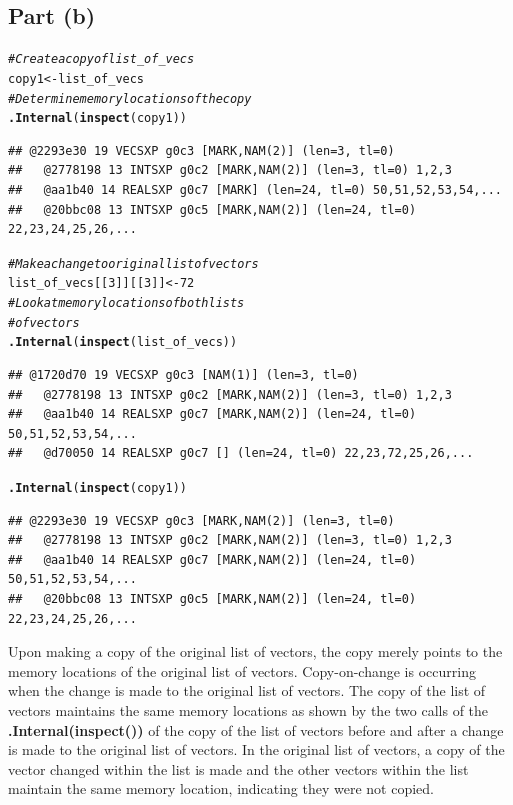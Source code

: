 \documentclass{article}\usepackage[]{graphicx}\usepackage[]{color}
\makeatletter
\newcommand{\hlnum}[1]{\textcolor[rgb]{0.686,0.059,0.569}{#1}}%
\newcommand{\hlcom}[1]{\textcolor[rgb]{0.678,0.584,0.686}{\textit{#1}}}%
\newcommand{\hlstd}[1]{\textcolor[rgb]{0.345,0.345,0.345}{#1}}%
\newcommand{\hlkwb}[1]{\textcolor[rgb]{0.69,0.353,0.396}{#1}}%
\newcommand{\hlkwd}[1]{\textcolor[rgb]{0.737,0.353,0.396}{\textbf{#1}}}%
\newenvironment{kframe}{%
 \def\at@end@of@kframe{}%
 \ifinner\ifhmode%
  \def\at@end@of@kframe{\end{minipage}}%
  \begin{minipage}{\columnwidth}%
 \fi\fi%
 \def\FrameCommand##1{\hskip\@totalleftmargin \hskip-\fboxsep
 \colorbox{shadecolor}{##1}\hskip-\fboxsep
     \hskip-\linewidth \hskip-\@totalleftmargin \hskip\columnwidth}%
 \MakeFramed {\advance\hsize-\width
   \@totalleftmargin\z@ \linewidth\hsize
   \@setminipage}}%
 {\par\unskip\endMakeFramed%
 \at@end@of@kframe}
\newenvironment{knitrout}{}{} %
\makeatother
\begin{document}
\subsection{Part (b)}
\begin{knitrout}
\color{fgcolor}\begin{kframe}
\begin{alltt}
\hlcom{#Create a copy of list_of_vecs}
\hlstd{copy1} \hlkwb{<-} \hlstd{list_of_vecs}
\hlcom{#Determine memory locations of the copy}
\hlkwd{.Internal}\hlstd{(}\hlkwd{inspect}\hlstd{(copy1))}
\end{alltt}
\begin{verbatim}
## @2293e30 19 VECSXP g0c3 [MARK,NAM(2)] (len=3, tl=0)
##   @2778198 13 INTSXP g0c2 [MARK,NAM(2)] (len=3, tl=0) 1,2,3
##   @aa1b40 14 REALSXP g0c7 [MARK] (len=24, tl=0) 50,51,52,53,54,...
##   @20bbc08 13 INTSXP g0c5 [MARK,NAM(2)] (len=24, tl=0) 22,23,24,25,26,...
\end{verbatim}
\begin{alltt}
\hlcom{#Make a change to original list of vectors}
\hlstd{list_of_vecs[[}\hlnum{3}\hlstd{]][[}\hlnum{3}\hlstd{]]} \hlkwb{<-} \hlnum{72}
\hlcom{#Look at memory locations of both lists}
\hlcom{#of vectors}
\hlkwd{.Internal}\hlstd{(}\hlkwd{inspect}\hlstd{(list_of_vecs))}
\end{alltt}
\begin{verbatim}
## @1720d70 19 VECSXP g0c3 [NAM(1)] (len=3, tl=0)
##   @2778198 13 INTSXP g0c2 [MARK,NAM(2)] (len=3, tl=0) 1,2,3
##   @aa1b40 14 REALSXP g0c7 [MARK,NAM(2)] (len=24, tl=0) 50,51,52,53,54,...
##   @d70050 14 REALSXP g0c7 [] (len=24, tl=0) 22,23,72,25,26,...
\end{verbatim}
\begin{alltt}
\hlkwd{.Internal}\hlstd{(}\hlkwd{inspect}\hlstd{(copy1))}
\end{alltt}
\begin{verbatim}
## @2293e30 19 VECSXP g0c3 [MARK,NAM(2)] (len=3, tl=0)
##   @2778198 13 INTSXP g0c2 [MARK,NAM(2)] (len=3, tl=0) 1,2,3
##   @aa1b40 14 REALSXP g0c7 [MARK,NAM(2)] (len=24, tl=0) 50,51,52,53,54,...
##   @20bbc08 13 INTSXP g0c5 [MARK,NAM(2)] (len=24, tl=0) 22,23,24,25,26,...
\end{verbatim}
\end{kframe}
\end{knitrout}
Upon making a copy of the original list of vectors, the copy merely points to the memory locations of the original list of vectors.  Copy-on-change is occurring when the change is made to the original list of vectors.  The copy of the list of vectors maintains the same memory locations as shown by the two calls of the \textbf{.Internal(inspect())} of the copy of the list of vectors before and after a change is made to the original list of vectors.  In the original list of vectors, a copy of the vector changed within the list is made and the other vectors within the list maintain the same memory location, indicating they were not copied.
\end{document}
